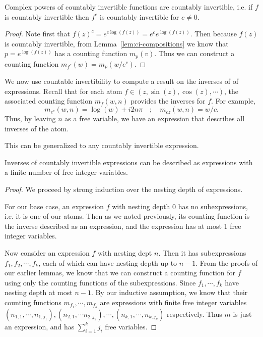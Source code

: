 \begin{lemma}
  \label{lem:ci-inversions}
  Complex powers of countably invertible functions are countably invertible,
  i.e. if $f$ is countably invertible then $f^c$ is countably invertible
  for $c \neq 0$.
\end{lemma}
\begin{proof}
  Note first that $f(z)^c = e^{c\log(f(z))} = e^c e^{\log(f(z))}$.
  Then because $f(z)$ is countably invertible, from
  Lemma~\ref{lem:ci-compositions} we know that $p = e^{\log(f(z))}$ has a
  counting function $m_p(v)$. Thus we can construct a counting function
  $m_{f^c}(w) = m_p(w/e^c).$
\end{proof}

We now use countable invertibility to compute a result on the inverses of
of expressions. Recall that for each atom $f \in (z, \sin(z), \cos(z),
\cdots)$, the associated counting function $m_f(w, n)$ provides the
inverses for $f$. For example,
\[m_{e^z}(w, n) = \log(w) + i2n\pi \quad;\quad m_{cz}(w, n) = w/c. \]
Thus, by leaving $n$ as a free variable, we have an expression that
describes all inverses of the atom.

This can be generalized to any countably invertible expression.
\begin{theorem}
  \label{thm:expression-inversion}
  Inverses of countably invertible expressions can be described
  as expressions with a finite number of free integer variables.
\end{theorem}
\begin{proof}
  We proceed by strong induction over the nesting depth of expressions.

  For our base case, an expression $f$ with nesting depth 0 has no
  subexpressions, i.e. it is one of our atoms. Then as we noted
  previously, its counting function is the inverse described as
  an expression, and the expression has at most 1 free integer variables.

  Now consider an expression $f$ with nesting dept $n$. Then it has
  subexpressions $f_1, f_2, \cdots, f_k$, each of which can have
  nesting depth up to $n - 1$. From the proofs of our earlier lemmas,
  we know that we can construct a counting function for $f$ using only
  the counting functions of the subexpressions. Since $f_1, \cdots, f_k$
  have nesting depth at most $n - 1$. By our inductive assumption,
  we know that their counting functions $m_{f_1}, \cdots, m_{f_k}$ are
  expressions with finite free integer variables
  $(n_{1,1}, \cdots, n_{1,j_1}), (n_{2,1}, \cdots n_{2,j_2}),
  \cdots, (n_{k,1}, \cdots, n_{k, j_k})$ respectively.
  Thus $m$ is just an expression, and has $\sum_{i=1}^k j_i$
  free variables.
\end{proof}

